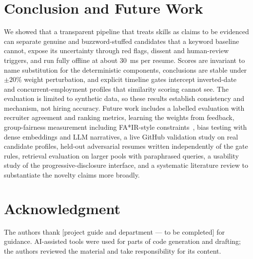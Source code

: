 \documentclass[conference]{IEEEtran}
\begin{document}
\section{Conclusion and Future Work}
We showed that a transparent pipeline that treats skills as claims to be evidenced can separate genuine and buzzword-stuffed candidates that a keyword baseline cannot, expose its uncertainty through red flags, dissent and human-review triggers, and run fully offline at about 30~ms per resume. Scores are invariant to name substitution for the deterministic components, conclusions are stable under $\pm20\%$ weight perturbation, and explicit timeline gates intercept inverted-date and concurrent-employment profiles that similarity scoring cannot see. The evaluation is limited to synthetic data, so these results establish consistency and mechanism, not hiring accuracy. Future work includes a labelled evaluation with recruiter agreement and ranking metrics, learning the weights from feedback, group-fairness measurement including FA*IR-style constraints~\cite{fair}, bias testing with dense embeddings and LLM narratives, a live GitHub validation study on real candidate profiles, held-out adversarial resumes written independently of the gate rules, retrieval evaluation on larger pools with paraphrased queries, a usability study of the progressive-disclosure interface, and a systematic literature review to substantiate the novelty claims more broadly.

\section*{Acknowledgment}
The authors thank [project guide and department --- to be completed] for guidance. AI-assisted tools were used for parts of code generation and drafting; the authors reviewed the material and take responsibility for its content.
\end{document}
